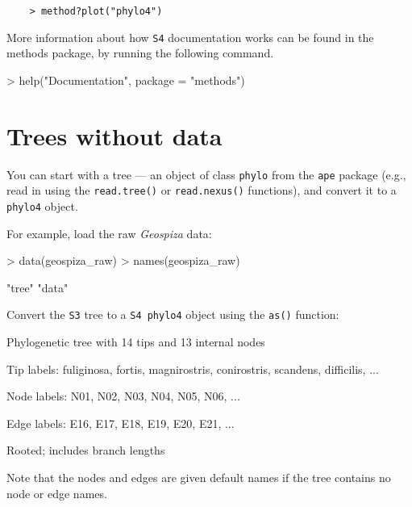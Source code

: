 \documentclass{article}
\newcommand{\code}[1]{{{\tt #1}}}
\begin{document}
\begin{verbatim}
	> method?plot("phylo4")
\end{verbatim}

More information about how \code{S4} documentation works 
can be found in the methods package, by running the following command.

\begin{Schunk}
\begin{Sinput}
> help("Documentation", package = "methods")
\end{Sinput}
\end{Schunk}

\section{Trees without data}

You can start with a tree --- an object of
class \code{phylo} from the \code{ape} package
(e.g., read in using the \code{read.tree()} or \code{read.nexus()}
functions), and convert it to a \code{phylo4} object.

For example, load the raw \emph{Geospiza} data:
\begin{Schunk}
\begin{Sinput}
> data(geospiza_raw)
> names(geospiza_raw)
\end{Sinput}
\begin{Soutput}
[1] "tree" "data"
\end{Soutput}
\end{Schunk}

Convert the \code{S3} tree to a \code{S4 phylo4} object using the \code{as()} function:
\begin{Schunk}
\begin{Soutput}
Phylogenetic tree with 14 tips and 13 internal nodes

Tip labels:
	fuliginosa, fortis, magnirostris, conirostris, scandens, difficilis, ...

Node labels:
	N01, N02, N03, N04, N05, N06, ...

Edge labels:
	E16, E17, E18, E19, E20, E21, ...

Rooted; includes branch lengths
\end{Soutput}
\end{Schunk}

Note that the nodes and edges are given default names if the tree contains no node or edge names.
\end{document}
